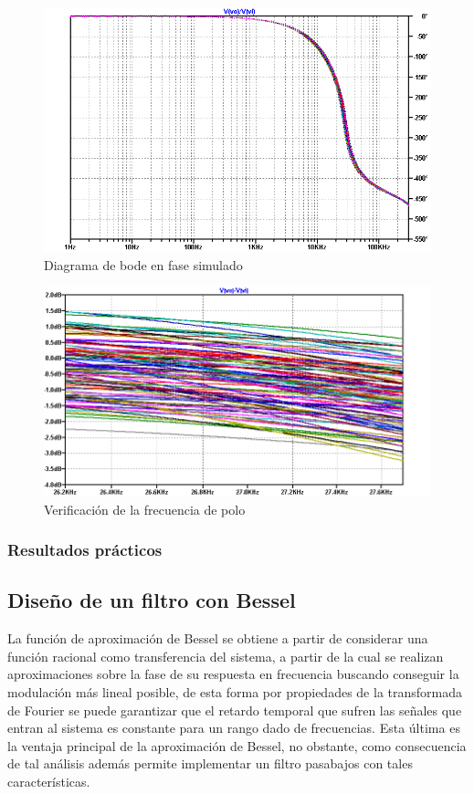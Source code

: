 \begin{figure}[H]
    \centering
    \includegraphics[scale=0.6]{../EJ1/Recursos/legendre_verificacion_fase.png}
    \caption{Diagrama de bode en fase simulado}
\end{figure}

\begin{figure}[H]
    \centering
    \includegraphics[scale=0.6]{../EJ1/Recursos/legendre_verificacion_fp.png}
    \caption{Verificaci\'on de la frecuencia de polo}
\end{figure}

\subsubsection{Resultados pr\'acticos}

\subsection{Dise\~no de un filtro con Bessel}
La funci\'on de aproximaci\'on de Bessel se obtiene a partir de considerar una funci\'on racional como transferencia del sistema, a partir de la cual se realizan aproximaciones sobre la fase de su respuesta en frecuencia
buscando conseguir la modulaci\'on m\'as lineal posible, de esta forma por propiedades de la transformada de Fourier se puede garantizar que el retardo temporal que sufren las se\~nales que entran al sistema es constante
para un rango dado de frecuencias. Esta \'ultima es la ventaja principal de la aproximaci\'on de Bessel, no obstante, como consecuencia de tal an\'alisis adem\'as permite implementar un filtro pasabajos con tales caracter\'isticas.

